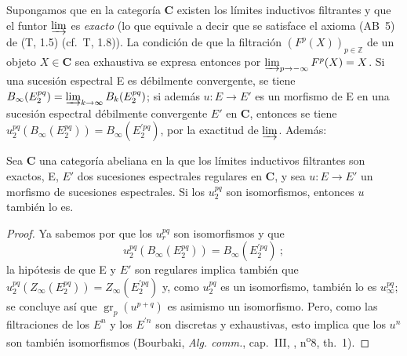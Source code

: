 \begin{env}[11.1.4]
\label{0.11.1.4}
\label{0.11.1.4-fr}
Supongamos que en la categoría $\boldsymbol{C}$ existen los límites inductivos filtrantes y que el funtor $\varinjlim$ es \emph{exacto} (lo que equivale a decir que se satisface el axioma (AB~5) de (T, 1.5) (cf.~T, 1.8)).
La condición de que la filtración $(F^p(X))_{p\in\mathbb Z}$ de un objeto $X\in\boldsymbol{C}$ sea exhaustiva se expresa entonces por $\varinjlim_{p\to-\infty}F^p(X)=X$. Si una sucesión espectral E es débilmente convergente, se tiene
$B_\infty(E_2^{pq})=\varinjlim_{k\to\infty}B_k(E_2^{pq})$; si además $u:E\to E'$ es un morfismo de E en una sucesión espectral débilmente convergente $E'$ en $\boldsymbol{C}$, entonces se tiene $u_2^{pq}(B_\infty(E_2^{pq}))=B_\infty(E_2^{\prime pq})$, por la exactitud de $\varinjlim$.
Además:
\end{env}

\begin{proposition}[11.1.5]
\label{0.11.1.5}
\label{0.11.1.5-fr}
Sea $\mathbf{C}$ una categoría abeliana en la que los límites
inductivos filtrantes son exactos, \textup{E}, $E'$ dos sucesiones espectrales regulares en $\mathbf{C}$, y sea $u:E\to E'$ un morfismo de sucesiones espectrales.
Si los $u_2^{pq}$ son isomorfismos, entonces $u$ también lo es.
\end{proposition}

\begin{proof}
Ya sabemos por  que los $u_r^{pq}$ son isomorfismos y que
\[
  u_2^{pq}(B_\infty(E_2^{pq}))=B_\infty(E_2^{\prime pq})~;
\]
la hipótesis de que E y $E'$ son regulares implica también que $u_2^{pq}(Z_\infty(E_2^{pq}))=Z_\infty(E_2^{\prime pq})$ y, como $u_2^{pq}$ es un isomorfismo, también lo es $u_\infty^{pq}$; se concluye así que $\operatorname{gr}_p(u^{p+q})$ es asimismo un isomorfismo.
Pero, como las filtraciones de los $E^n$ y los $E^{\prime n}$ son discretas y exhaustivas, esto implica que los $u^n$ son también isomorfismos (Bourbaki, \emph{Alg. comm.}, cap.~III, , n\textsuperscript{o}8, th.~1).
\end{proof}


